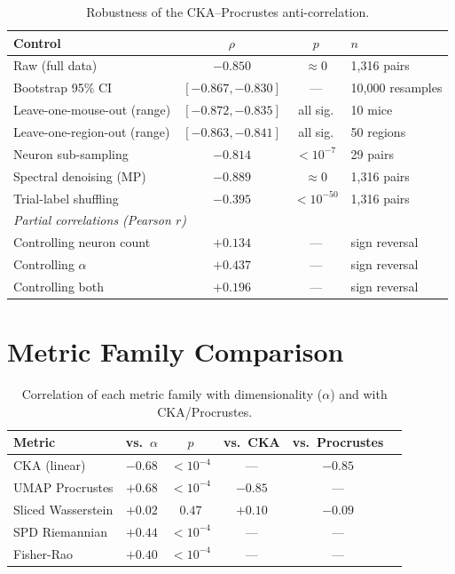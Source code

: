 \documentclass{article}
\begin{document}
\begin{table}[h]
\centering
\small
\caption{Robustness of the CKA--Procrustes anti-correlation.}
\label{tab:robustness}
\begin{tabular}{@{}lccl@{}}
\toprule
\textbf{Control} & \textbf{$\rho$} & \textbf{$p$} & \textbf{$n$} \\
\midrule
Raw (full data) & $-0.850$ & $\approx 0$ & 1,316 pairs \\
Bootstrap 95\% CI & $[-0.867, -0.830]$ & --- & 10,000 resamples \\
Leave-one-mouse-out (range) & $[-0.872, -0.835]$ & all sig. & 10 mice \\
Leave-one-region-out (range) & $[-0.863, -0.841]$ & all sig. & 50 regions \\
Neuron sub-sampling & $-0.814$ & $< 10^{-7}$ & 29 pairs \\
Spectral denoising (MP) & $-0.889$ & $\approx 0$ & 1,316 pairs \\
Trial-label shuffling & $-0.395$ & $< 10^{-50}$ & 1,316 pairs \\
\midrule
\multicolumn{4}{l}{\emph{Partial correlations (Pearson $r$)}} \\
Controlling neuron count & $+0.134$ & --- & sign reversal \\
Controlling $\alpha$ & $+0.437$ & --- & sign reversal \\
Controlling both & $+0.196$ & --- & sign reversal \\
\bottomrule
\end{tabular}
\end{table}

\section{Metric Family Comparison}
\label{app:metrics}

\begin{table}[h]
\centering
\small
\caption{Correlation of each metric family with dimensionality ($\alpha$) and with CKA/Procrustes.}
\label{tab:metrics}
\begin{tabular}{@{}lccccc@{}}
\toprule
\textbf{Metric} & \textbf{vs.\ $\alpha$} & \textbf{$p$} & \textbf{vs.\ CKA} & \textbf{vs.\ Procrustes} \\
\midrule
CKA (linear) & $-0.68$ & $< 10^{-4}$ & --- & $-0.85$ \\
UMAP Procrustes & $+0.68$ & $< 10^{-4}$ & $-0.85$ & --- \\
Sliced Wasserstein & $+0.02$ & $0.47$ & $+0.10$ & $-0.09$ \\
SPD Riemannian & $+0.44$ & $< 10^{-4}$ & --- & --- \\
Fisher-Rao & $+0.40$ & $< 10^{-4}$ & --- & --- \\
\bottomrule
\end{tabular}
\end{table}
\end{document}
